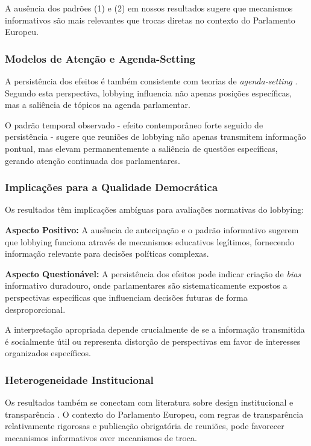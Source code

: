 A ausência dos padrões (1) e (2) em nossos resultados sugere que mecanismos informativos são mais relevantes que trocas diretas no contexto do Parlamento Europeu.

\subsubsection{Modelos de Atenção e Agenda-Setting}

A persistência dos efeitos é também consistente com teorias de \emph{agenda-setting} \cite{jones2005politics, baumgartner2009lobbying}. Segundo esta perspectiva, lobbying influencia não apenas posições específicas, mas a saliência de tópicos na agenda parlamentar.

O padrão temporal observado - efeito contemporâneo forte seguido de persistência - sugere que reuniões de lobbying não apenas transmitem informação pontual, mas elevam permanentemente a saliência de questões específicas, gerando atenção continuada dos parlamentares.

\subsubsection{Implicações para a Qualidade Democrática}

Os resultados têm implicações ambíguas para avaliações normativas do lobbying:

\textbf{Aspecto Positivo:} A ausência de antecipação e o padrão informativo sugerem que lobbying funciona através de mecanismos educativos legítimos, fornecendo informação relevante para decisões políticas complexas.

\textbf{Aspecto Questionável:} A persistência dos efeitos pode indicar criação de \emph{bias} informativo duradouro, onde parlamentares são sistematicamente expostos a perspectivas específicas que influenciam decisões futuras de forma desproporcional.

A interpretação apropriada depende crucialmente de se a informação transmitida é socialmente útil ou representa distorção de perspectivas em favor de interesses organizados específicos.

\subsubsection{Heterogeneidade Institucional}

Os resultados também se conectam com literatura sobre design institucional e transparência \cite{de2003legislative, coen2007lobbying}. O contexto do Parlamento Europeu, com regras de transparência relativamente rigorosas e publicação obrigatória de reuniões, pode favorecer mecanismos informativos over mecanismos de troca.

